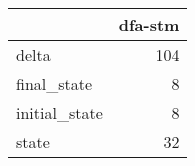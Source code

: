 \begin{tabular}{lr}
\toprule
{} &  dfa-stm \\
\midrule
delta         &      104 \\
final\_state   &        8 \\
initial\_state &        8 \\
state         &       32 \\
\bottomrule
\end{tabular}
